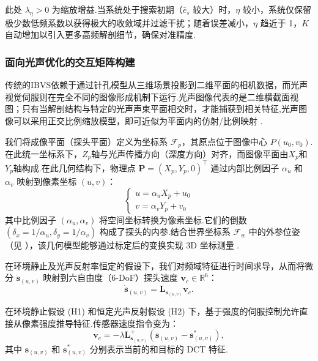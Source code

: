 \documentclass{article}
\begin{document}
此处 $\lambda_{\eta} > 0$ 为缩放增益.当系统处于搜索初期（$\bar{e}_s$ 较大）时，$\eta$ 较小，系统仅保留极少数低频系数以获得极大的收敛域并过滤干扰；随着误差减小，$\eta$ 趋近于 1，$K$ 自动增加以引入更多高频解剖细节，确保对准精度.

\subsubsection{面向光声优化的交互矩阵构建}
\label{sec:PA-Optimized_Interaction_Matrix}

传统的IBVS依赖于通过针孔模型从三维场景投影到二维平面的相机数据，而光声视觉伺服则在完全不同的图像形成机制下运行.光声图像代表的是二维横截面视图；只有当解剖结构与特定的光声声束平面相交时，才能捕获到相关特征,光声图像可以采用正交比例缩放模型，即可近似为平面内的仿射/比例映射 \cite{nadeau2013intensity}.

我们将成像平面（探头平面）定义为坐标系 \(\mathcal{F}_p\)，其原点位于图像中心 \(P(u_0, v_0)\).在此统一坐标系下，\(Z_p\)轴与光声传播方向（深度方向）对齐，而图像平面由\(X_p\)和\(Y_p\)轴构成.在此几何结构下，物理点 \(\mathbf{P} = (X_p, Y_p, 0)^\top\) 通过内部比例因子 \(\alpha_u\) 和 \(\alpha_v\) 映射到像素坐标 \((u, v)\)：
\begin{equation}
\begin{cases}
u = \alpha_u X_p + u_0 \\[2mm]
v = \alpha_v Y_p + v_0
\end{cases}
\end{equation}
其中比例因子 $(\alpha_u, \alpha_v)$ 将空间坐标转换为像素坐标.它们的倒数 $(\delta_x = 1/\alpha_u, \delta_y = 1/\alpha_v)$ 构成了探头的内参.结合世界坐标系 $\mathcal{F}_w$ 中的外参位姿（见 ），该几何模型能够通过标定后的变换实现 3D 坐标测量 \cite{mercier2005review}.

在环境静止及光声反射率恒定的假设下，我们对频域特征进行时间求导，从而将微分 $\dot{\boldsymbol{s}}_{(u,v)}$ 映射到六自由度（6-DoF）探头速度 $\mathbf{v}_c \in \mathbb{R}^6$：
\begin{equation}
\dot{\boldsymbol{s}}_{(u,v)} = \boldsymbol{L}_{\boldsymbol{s}_{(u,v)}} \mathbf{v}_c.
\label{eq:s=LV}
\end{equation}

在环境静止假设 (H1) 和恒定光声反射假设 (H2) \cite{nadeau2013intensity} 下，基于强度的伺服控制允许直接从像素强度推导特征.传感器速度指令变为：
\begin{equation}
\mathbf{v}_c = -\lambda \boldsymbol{L}^{+}_{\boldsymbol{s}_{(u,v)}} (\boldsymbol{s}_{(u,v)} - \boldsymbol{s}^*_{(u,v)}),
\end{equation}
其中 $\boldsymbol{s}_{(u,v)}$ 和 $\boldsymbol{s}^*_{(u,v)}$ 分别表示当前的和目标的 DCT 特征.
\end{document}
